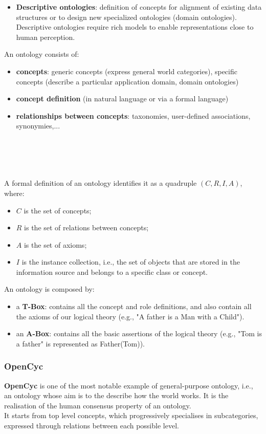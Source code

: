 \documentclass[10pt,a4paper]{article}
\newcommand{\nline}{\\~\\}
\begin{document}
\begin{justify}
\begin{itemize}
	\item \textbf{Descriptive ontologies}: definition of concepts for alignment of existing data structures or to design new specialized ontologies (domain ontologies). Descriptive ontologies require rich models to enable representations close to human perception.
\end{itemize}
An ontology consists of:
\begin{itemize}
	\item \textbf{concepts}: generic concepts (express general world categories), specific concepts (describe a particular application domain, domain ontologies)
	\item \textbf{concept definition} (in natural language or via a formal language)
	\item \textbf{relationships between concepts}: taxonomies, user-defined associations, synonymies,...
\end{itemize} \nline

\nline
A formal definition of an ontology identifies it as a quadruple \boltmath$(C,R,I,A)$, where:
\begin{itemize}
    \item $C$ is the set of concepts;
    \item $R$ is the set of relations between concepts;
    \item $A$ is the set of axioms;
    \item $I$ is the instance collection, i.e., the set of objects that are stored in the information source and belongs to a specific class or concept.
\end{itemize}

An ontology is composed by:
\begin{itemize}
	\item a \textbf{T-Box}: contains all the concept and role definitions, and also contain all the axioms of our logical theory (e.g., "A father is a Man with a Child").
	\item an \textbf{A-Box}: contains all the basic assertions of the logical theory (e.g., "Tom is a father" is represented as Father(Tom)).
\end{itemize}

\subsubsection{OpenCyc}
\textbf{OpenCyc} is one of the most notable example of general-purpose ontology, i.e., an ontology whose aim is to the describe how the world works. It is the realisation of the human consensus property of an ontology. \\
It starts from top level concepts, which progressively specialises in subcategories, expressed through relations between each possible level.
\pagebreak

\end{justify}
\end{document}

